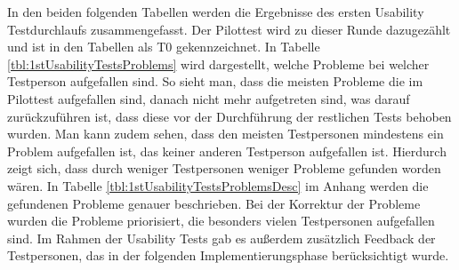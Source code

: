 In den beiden folgenden Tabellen werden die Ergebnisse des ersten Usability Testdurchlaufs zusammengefasst. Der Pilottest wird zu dieser Runde dazugezählt und ist in den Tabellen als T0 gekennzeichnet. In Tabelle \ref{tbl:1stUsabilityTestsProblems} wird dargestellt, welche Probleme bei welcher Testperson aufgefallen sind. So sieht man, dass die meisten Probleme die im Pilottest aufgefallen sind, danach nicht mehr aufgetreten sind, was darauf zurückzuführen ist, dass diese vor der Durchführung der restlichen Tests behoben wurden. Man kann zudem sehen, dass den meisten Testpersonen mindestens ein Problem aufgefallen ist, das keiner anderen Testperson aufgefallen ist. Hierdurch zeigt sich, dass durch weniger Testpersonen weniger Probleme gefunden worden wären. In Tabelle \ref{tbl:1stUsabilityTestsProblemsDesc} im Anhang werden die gefundenen Probleme genauer beschrieben. Bei der Korrektur der Probleme wurden die Probleme priorisiert, die besonders vielen Testpersonen aufgefallen sind. Im Rahmen der Usability Tests gab es außerdem zusätzlich Feedback der Testpersonen, das in der folgenden Implementierungsphase berücksichtigt wurde.

